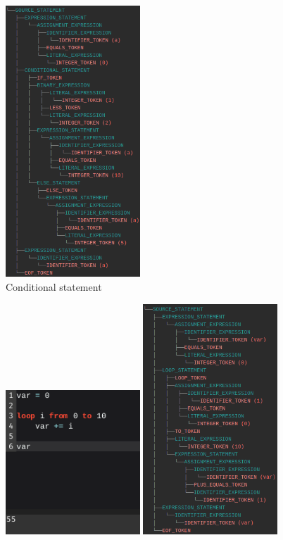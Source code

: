 \documentclass[
]{report}
\begin{document}
\begin{appendices}
\begin{figure}
		\includegraphics[width=0.45\textwidth]{conditional-tree}
		\caption{Conditional statement}
		\label{fig:conditional-statement}
	\end{figure}
	\begin{figure}
		\centering
		\includegraphics[width=0.45\textwidth]{loop-code}
		\includegraphics[width=0.45\textwidth]{loop-tree}

\end{figure}
\end{appendices}
\end{document}
